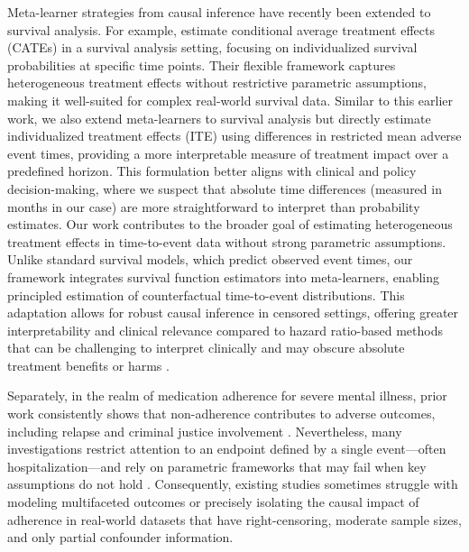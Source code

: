 Meta-learner strategies from causal inference \citep{kunzel2019metalearners} have recently been extended to survival analysis.
For example, \citet{bo2024meta} estimate conditional average treatment effects (CATEs) in a survival analysis setting, focusing on individualized survival probabilities at specific time points.
Their flexible framework captures heterogeneous treatment effects without restrictive parametric assumptions, making it well-suited for complex real-world survival data.
Similar to this earlier work, we also extend meta-learners to survival analysis but directly estimate individualized treatment effects (ITE) using differences in restricted mean adverse event times, providing a more interpretable measure of treatment impact over a predefined horizon.
This formulation better aligns with clinical and policy decision-making, where we suspect that absolute time differences (measured in months in our case) are more straightforward to interpret than probability estimates. 
Our work contributes to the broader goal of estimating heterogeneous treatment effects in time-to-event data without strong parametric assumptions.
Unlike standard survival models, which predict observed event times, our framework integrates survival function estimators into meta-learners, enabling principled estimation of counterfactual time-to-event distributions. This adaptation allows for robust causal inference in censored settings, offering greater interpretability and clinical relevance compared to hazard ratio-based methods that can be challenging to interpret clinically and may obscure absolute treatment benefits or harms \citep{hernan2010hazards, aalen2015does}.

Separately, in the realm of medication adherence for severe mental illness, prior work consistently shows that non-adherence contributes to adverse outcomes, including relapse and criminal justice involvement \citep{semahegn2020psychotropic, lin2022time, correll2018comparison}.
Nevertheless, many investigations restrict attention to an endpoint defined by a single event---often hospitalization---and rely on parametric frameworks that may fail when key assumptions do not hold \citep{campos2021measuring, tannous2024predictive}.
Consequently, existing studies sometimes struggle with modeling multifaceted outcomes or precisely isolating the causal impact of adherence in real-world datasets that have right-censoring, moderate sample sizes, and only partial confounder information.

